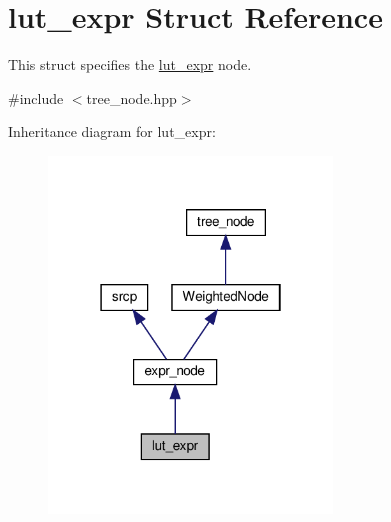 \hypertarget{structlut__expr}{}\section{lut\+\_\+expr Struct Reference}
\label{structlut__expr}


This struct specifies the \hyperlink{structlut__expr}{lut\+\_\+expr} node.  




{\ttfamily \#include $<$tree\+\_\+node.\+hpp$>$}



Inheritance diagram for lut\+\_\+expr\+:
\nopagebreak
\begin{figure}[H]
\begin{center}
\leavevmode
\includegraphics[width=214pt]{d1/d17/structlut__expr__inherit__graph}
\end{center}
\end{figure}


